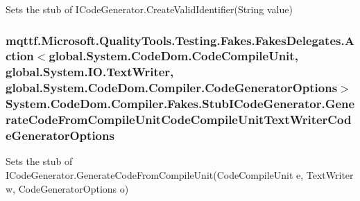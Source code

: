 Sets the stub of I\-Code\-Generator.\-Create\-Valid\-Identifier(\-String value)

\hypertarget{class_system_1_1_code_dom_1_1_compiler_1_1_fakes_1_1_stub_i_code_generator_ae0be78111754b225504a2098200251c5}{
\subsubsection[{Generate\-Code\-From\-Compile\-Unit\-Code\-Compile\-Unit\-Text\-Writer\-Code\-Generator\-Options}]{\setlength{\rightskip}{0pt plus 5cm}mqttf.\-Microsoft.\-Quality\-Tools.\-Testing.\-Fakes.\-Fakes\-Delegates.\-Action$<$global.\-System.\-Code\-Dom.\-Code\-Compile\-Unit, global.\-System.\-I\-O.\-Text\-Writer, global.\-System.\-Code\-Dom.\-Compiler.\-Code\-Generator\-Options$>$ System.\-Code\-Dom.\-Compiler.\-Fakes.\-Stub\-I\-Code\-Generator.\-Generate\-Code\-From\-Compile\-Unit\-Code\-Compile\-Unit\-Text\-Writer\-Code\-Generator\-Options}}\label{class_system_1_1_code_dom_1_1_compiler_1_1_fakes_1_1_stub_i_code_generator_ae0be78111754b225504a2098200251c5}


Sets the stub of I\-Code\-Generator.\-Generate\-Code\-From\-Compile\-Unit(\-Code\-Compile\-Unit e, Text\-Writer w, Code\-Generator\-Options o)

